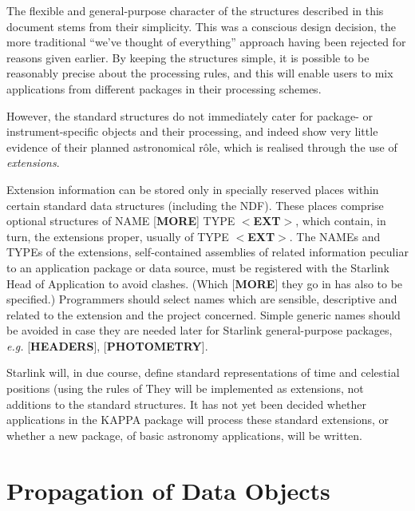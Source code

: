 The flexible and general-purpose character of the structures
described in this document stems from their simplicity.  This
was a conscious design decision, the more traditional ``we've
thought of everything'' approach having been rejected for
reasons given earlier.  By keeping the structures simple, it
is possible to be reasonably precise about the processing
rules, and this will enable users to mix applications from
different packages in their processing schemes.

However, the standard structures do not immediately cater for
package- or instrument-specific objects
and their processing, and indeed show very little evidence
of their planned astronomical r\^{o}le, which is realised
through the use of {\it extensions}.

Extension information can be stored only in specially
reserved places within
certain standard data structures (including the
NDF).  These places comprise optional structures of NAME
{[}{\bf MORE}{]}
TYPE $<${\bf EXT}$>$, which contain, in turn,
the extensions proper, usually of TYPE $<${\bf EXT}$>$.
The NAMEs and TYPEs of the extensions, self-contained assemblies of
related information peculiar to an application package or
data source, must be registered with the Starlink Head of
Application to avoid clashes.  (Which {[}{\bf MORE}{]} they
go in has also to be specified.)
Programmers should select names
which are sensible, descriptive and related to the
extension and the project concerned.
Simple generic names should be
avoided in case they are needed later for
Starlink general-purpose packages, {\it e.g.}
\mbox{{[}{\bf HEADERS}{]}}, {[}{\bf PHOTOMETRY}{]}.

Starlink will, in due course,
define standard representations of time and celestial
positions (using the rules of 
They will be implemented as extensions, not additions to the
standard structures.  It has not yet been decided
whether applications in the {\small KAPPA} package
will process these standard extensions, or whether a
new package, of basic astronomy applications, will be written.

\section{Propagation of Data Objects\label{se:propag}}

